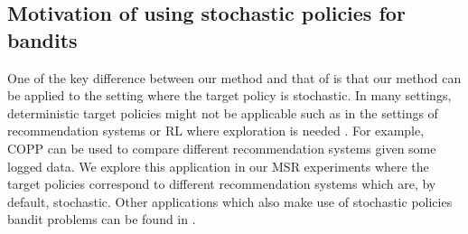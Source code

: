 \subsection{Motivation of using stochastic policies for bandits}
One of the key difference between our method and that of \cite{lei2020conformal} is that our method can be applied to the setting where the target policy is stochastic. In many settings, deterministic target policies might not be applicable such as in the settings of recommendation systems or RL where exploration is needed \citep{swaminathan2016off, su2020doubly}. For example, COPP can be used to compare different recommendation systems given some logged data. We explore this application in our MSR experiments where the target policies correspond to different recommendation systems which are, by default, stochastic. Other applications which also make use of stochastic policies bandit problems can be found in \cite{su2020doubly, farajtabar2018more}.







